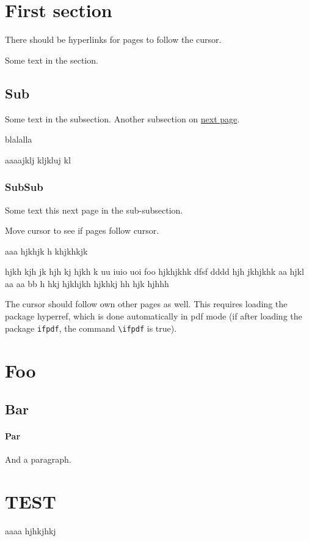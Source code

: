 \documentclass{article}
\begin{document}
\section{First section}

There should be hyperlinks for pages to follow the cursor.  

\tableofcontents



Some text in the section.  
 
\subsection {Sub}

Some text in the subsection. 
Another subsection on \hyperlink{next}{next page}.


blalalla  
\newpage

aaaajklj kljkluj kl
\subsubsection {SubSub} 

Some text this \hypertarget{next}{next page} in the sub-subsection. 

Move cursor to see if pages follow cursor.

\newpage

aaa hjkhjk h
\newpage
khjkhkjk

hjkh kjh jk  hjh kj hjkh k uu iuio uoi foo
hjkhjkhk  dfsf dddd hjh jkhjkhk aa hjkl
aa aa  bb  h hkj    hjkhjkh  hjkhkj hh hjk hjhhh

\medskip




The cursor should follow own other pages as well.
This requires loading the package hyperref, which is done
automatically in pdf mode (if after loading the package \texttt{ifpdf}, 
the command \verb"\ifpdf" is true). 


\section{Foo}

\subsection {Bar}


\paragraph {Par}

And a paragraph.


\section {TEST}

aaaa  hjhkjhkj 
\end{document}
